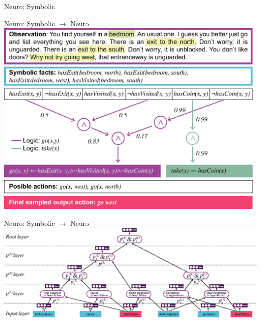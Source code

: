 \documentclass{lecture}
\begin{document}
\begin{frame}{Neuro; Symbolic}
\end{frame}

\begin{frame}{Neuro: Symbolic $\to$ Neuro}    
    \centering\includegraphics[width=.9\textwidth]{SW223228/slate-neuro-symbolic-type-4.eps}
\end{frame}

\begin{frame}{Neuro: Symbolic $\to$ Neuro}
    \centering\includegraphics[width=\textwidth]{SW223228/neuro-symbolic-huffman-tree.eps}
\end{frame}
\end{document}

